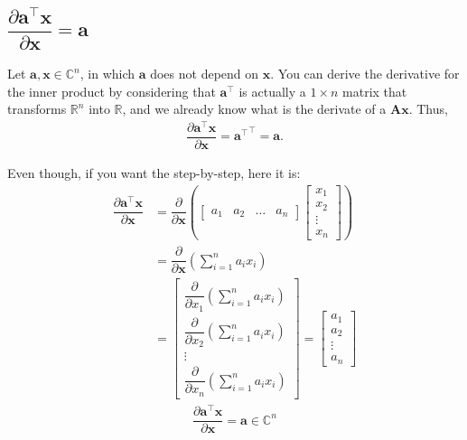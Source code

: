 \documentclass{article}
\newcommand{\trans}{\top}
\begin{document}
\subsection{\(\dfrac{\partial \mathbf{a}^\trans \mathbf{x}}{\partial \mathbf{x}} = \mathbf{a}\)}

Let \(\mathbf{a, x} \in \mathbb{C}^{n}\), in which \(\mathbf{a}\) does not depend on \(\mathbf{x}\). You can derive the derivative for the inner product by considering that \(\mathbf{a}^\trans\) is actually a \(1\times n\) matrix that transforms \(\mathbb{R}^{n}\) into \(\mathbb{R}\), and we already know what is the derivate of a \(\mathbf{Ax}\). Thus,
\begin{align}
    \dfrac{\partial \mathbf{a}^\trans \mathbf{x}}{\partial \mathbf{x}} = {\mathbf{a}^\trans}^\trans = \mathbf{a}.
\end{align}

Even though, if you want the step-by-step, here it is:
\begin{align}
    \dfrac{\partial \mathbf{a}^\trans \mathbf{x}}{\partial \mathbf{x}} &= \dfrac{\partial}{\partial \mathbf{x}} \left(
    \begin{bmatrix}
        a_1 & a_2 & \dots & a_n
    \end{bmatrix} \begin{bmatrix}
        x_{1} \\ x_{2} \\ \vdots \\ x_{n}
    \end{bmatrix} \right) \\
    & = \dfrac{\partial}{\partial \mathbf{x}} \left( \sum_{i = 1}^n a_ix_i \right) \\
    & = \begin{bmatrix}
        \dfrac{\partial}{\partial x_1} \left( \sum_{i = 1}^n a_ix_i \right) \\ \dfrac{\partial}{\partial x_2} \left( \sum_{i = 1}^n a_ix_i \right) \\ \vdots \\ \dfrac{\partial}{\partial x_n} \left( \sum_{i = 1}^n a_ix_i \right) 
    \end{bmatrix} = \begin{bmatrix}
        a_1 \\ a_2 \\ \vdots \\ a_n
    \end{bmatrix}
\end{align}
\begin{align}
    \boxed{\dfrac{\partial \mathbf{a}^\trans \mathbf{x}}{\partial \mathbf{x}} = \mathbf{a} \in \mathbb{C}^{n}}
\end{align}
\end{document}
